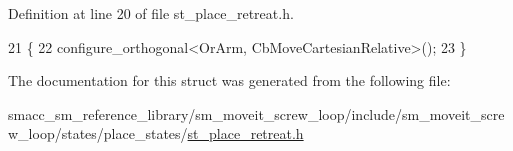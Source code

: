 Definition at line 20 of file st\+\_\+place\+\_\+retreat.\+h.


\begin{DoxyCode}
21             \{
22                 configure\_orthogonal<OrArm, CbMoveCartesianRelative>();
23             \}
\end{DoxyCode}


The documentation for this struct was generated from the following file\+:\begin{DoxyCompactItemize}
\item 
smacc\+\_\+sm\+\_\+reference\+\_\+library/sm\+\_\+moveit\+\_\+screw\+\_\+loop/include/sm\+\_\+moveit\+\_\+screw\+\_\+loop/states/place\+\_\+states/\hyperlink{sm__moveit__screw__loop_2include_2sm__moveit__screw__loop_2states_2place__states_2st__place__retreat_8h}{st\+\_\+place\+\_\+retreat.\+h}\end{DoxyCompactItemize}
